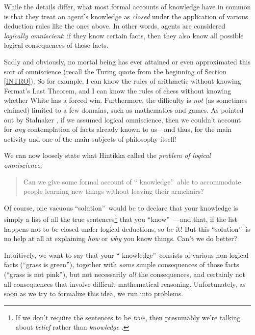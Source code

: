 \documentclass[12pt,onecolumn]{article}%
\begin{document}
While the details differ, what most formal accounts of knowledge have in
common is that they treat an agent's knowledge as \textit{closed} under the
application of various deduction rules like the ones above. In other words,
agents are considered \textit{logically omniscient}: if they know certain
facts, then they also know all possible logical consequences of those facts.

Sadly and obviously, no mortal being has ever attained or even approximated
this sort of omniscience (recall the Turing quote from the beginning of
Section \ref{INTRO}). So for example, I can know the rules of arithmetic
without knowing Fermat's Last Theorem, and I can know the rules of chess
without knowing whether White has a forced win. Furthermore, the difficulty
is \textit{not} (as sometimes claimed) limited to a few domains, such as
mathematics and games. As pointed out by Stalnaker \cite{stalnaker}, if we
assumed logical omniscience, then we couldn't account for \textit{any}
contemplation of facts already known to us---and thus, for the main activity
and one of the main subjects of philosophy itself!

We can now loosely state what Hintikka \cite{hintikka} called the
\textit{problem of logical omniscience}:

\begin{quotation}
\noindent Can we give some formal account of \textquotedblleft
knowledge\textquotedblright\  able to accommodate people learning new things
without leaving their armchairs?
\end{quotation}

Of course, one vacuous \textquotedblleft solution\textquotedblright\  would be
to declare that your knowledge is simply a list of all the true
sentences\footnote{If we don't require the sentences to be \textit{true}, then
presumably we're talking about \textit{belief} rather than \textit{knowledge}%
.} that you \textquotedblleft know\textquotedblright\ ---and that, if the list
happens not to be closed under logical deductions, so be it! But this
\textquotedblleft solution\textquotedblright\  is no help at all at explaining
\textit{how} or \textit{why} you know things. Can't we do better?

Intuitively, we want to say that your \textquotedblleft
knowledge\textquotedblright\  consists of various non-logical facts
(\textquotedblleft grass is green\textquotedblright ), together with
\textit{some} simple consequences of those facts (\textquotedblleft grass is
not pink\textquotedblright ), but not necessarily \textit{all} the
consequences, and certainly not all consequences that involve difficult
mathematical reasoning. Unfortunately, as soon as we try to formalize this
idea, we run into problems.
\end{document}
